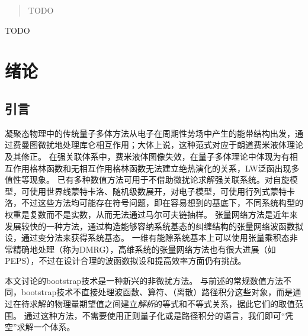 \documentclass[oneside]{fduthesis}
\begin{document}
\renewcommand{\Re}{\mathrm{Re}}
\renewcommand{\Im}{\mathrm{Im}}

\frontmatter

\tableofcontents

\begin{abstract}
TODO
\end{abstract}

\begin{abstract*}
TODO
\end{abstract*}

\mainmatter


%   
%   
%   

\chapter{绪论}

\section{引言}

凝聚态物理中的传统量子多体方法从电子在周期性势场中产生的能带结构出发，通过费曼图微扰地处理库仑相互作用；大体上说，这种范式对应于朗道费米液体理论及其修正\cite{mahan2013many}。
在强关联体系中，费米液体图像失效，在量子多体理论中体现为有相互作用格林函数和无相互作用格林函数无法建立绝热演化的关系，LW泛函出现多值性等现象\cite{Gunnarsson_2017}。
已有多种数值方法可用于不借助微扰论求解强关联系统。对自旋模型，可使用世界线蒙特卡洛、随机级数展开，对电子模型，可使用行列式蒙特卡洛，不过这些方法均可能存在符号问题，即在容易想到的基底下，不同系统构型的权重是复数而不是实数，从而无法通过马尔可夫链抽样\cite{sign_problem}。
张量网络方法是近年来发展较快的一种方法，通过构造能够容纳系统基态的纠缠结构的张量网络波函数拟设，通过变分法来获得系统基态。
一维有能隙系统基本上可以使用张量乘积态非常精确地处理（称为DMRG），高维系统的张量网络方法也有很大进展（如PEPS），不过在设计合理的波函数拟设和提高效率方面仍有挑战\cite{orus2019tensor}。

本文讨论的bootstrap技术是一种新兴的非微扰方法\cite{han_matrix,bhattacharya2021,kazakov2021analytic,han_manybody}。
与前述的常规数值方法不同，bootstrap技术不直接处理波函数、算符、（离散）路径积分这些对象，而是通过在待求解的物理量期望值之间建立\emph{解析}的等式和不等式关系，据此它们的取值范围。
通过这种方法，不需要使用正则量子化或是路径积分的语言，我们即可“凭空”求解一个体系。
\end{document}
